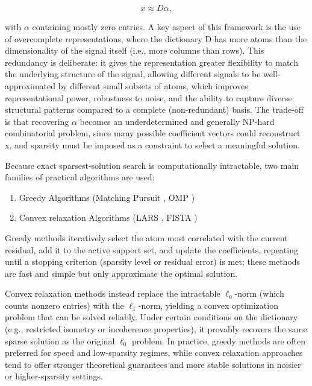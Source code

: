 \begin{equation}[Sparse Coding Approximation]
x \approx D\alpha,
\end{equation}

with $\alpha$ containing mostly zero entries. A key aspect of this framework is the use of overcomplete representations,
where the dictionary D has more atoms than the dimensionality of the signal itself (i.e., more columns than rows). This redundancy
is deliberate: it gives the representation greater flexibility to match the underlying structure of the signal, allowing different
signals to be well-approximated by different small subsets of atoms, which improves representational power, robustness to noise,
and the ability to capture diverse structural patterns compared to a complete (non-redundant) basis. The trade-off is that recovering
$\alpha$ becomes an underdetermined and generally NP-hard combinatorial problem, since many possible coefficient vectors could
reconstruct x, and sparsity must be imposed as a constraint to select a meaningful solution.

Because exact sparsest-solution search is computationally intractable, two main families of practical algorithms are used:

\begin{enumerate}
    \item Greedy Algorithms (Matching Pursuit \citep{mallat1993matching}, OMP \citep{342465})
    \item Convex relaxation Algorithms (LARS \citep{efron2004lars}, FISTA \citep{beck2009fista})
\end{enumerate}

Greedy methods iteratively select the atom most correlated with the current residual, add it to the active support set,
and update the coefficients, repeating until a stopping criterion (sparsity level or residual error) is met; these methods are
fast and simple but only approximate the optimal solution.

Convex relaxation methods instead replace the intractable $\ell_0$-norm (which counts nonzero entries) with the $\ell_1$-norm,
yielding a convex optimization problem that can be solved reliably. Under certain conditions
on the dictionary (e.g., restricted isometry or incoherence properties), it provably recovers the same sparse solution as the
original $\ell_0$ problem. In practice, greedy methods are often preferred for speed and low-sparsity regimes, while convex
relaxation approaches tend to offer stronger theoretical guarantees and more stable solutions in noisier or higher-sparsity settings.

